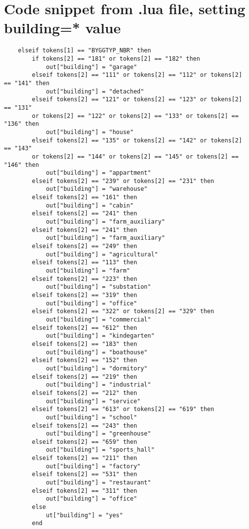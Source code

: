 \section{Code snippet from .lua file, setting building=* value}
\begin{lstlisting}
    elseif tokens[1] == "BYGGTYP_NBR" then
        if tokens[2] == "181" or tokens[2] == "182" then
            out["building"] = "garage"
        elseif tokens[2] == "111" or tokens[2] == "112" or tokens[2] == "141" then
            out["building"] = "detached"
        elseif tokens[2] == "121" or tokens[2] == "123" or tokens[2] == "131" 
        or tokens[2] == "122" or tokens[2] == "133" or tokens[2] == "136" then
            out["building"] = "house"
        elseif tokens[2] == "135" or tokens[2] == "142" or tokens[2] == "143" 
        or tokens[2] == "144" or tokens[2] == "145" or tokens[2] == "146" then
            out["building"] = "appartment"
        elseif tokens[2] == "239" or tokens[2] == "231" then
            out["building"] = "warehouse"
        elseif tokens[2] == "161" then
            out["building"] = "cabin"
        elseif tokens[2] == "241" then
            out["building"] = "farm_auxiliary"
        elseif tokens[2] == "241" then
            out["building"] = "farm_auxiliary"
        elseif tokens[2] == "249" then
            out["building"] = "agricultural"
        elseif tokens[2] == "113" then
            out["building"] = "farm"
        elseif tokens[2] == "223" then
            out["building"] = "substation"
        elseif tokens[2] == "319" then
            out["building"] = "office"
        elseif tokens[2] == "322" or tokens[2] == "329" then
            out["building"] = "commercial"
        elseif tokens[2] == "612" then
            out["building"] = "kindegarten"
        elseif tokens[2] == "183" then
            out["building"] = "boathouse"
        elseif tokens[2] == "152" then
            out["building"] = "dormitory"
        elseif tokens[2] == "219" then
            out["building"] = "industrial"
        elseif tokens[2] == "212" then
            out["building"] = "service"
        elseif tokens[2] == "613" or tokens[2] == "619" then
            out["building"] = "school"
        elseif tokens[2] == "243" then
            out["building"] = "greenhouse"
        elseif tokens[2] == "659" then
            out["building"] = "sports_hall"
        elseif tokens[2] == "211" then
            out["building"] = "factory"
        elseif tokens[2] == "531" then
            out["building"] = "restaurant"
        elseif tokens[2] == "311" then
            out["building"] = "office"
        else 
            ut["building"] = "yes"
        end 
\end{lstlisting}

